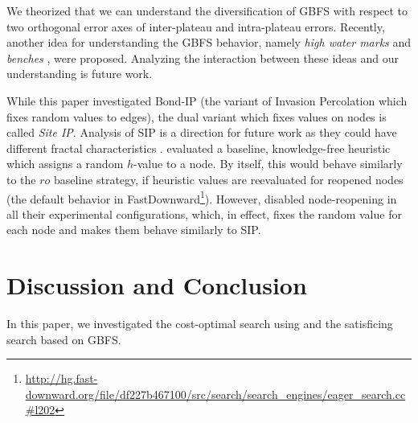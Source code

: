 We theorized that we can understand the diversification of GBFS with
respect to two orthogonal error axes of inter-plateau and intra-plateau
errors. Recently, another idea for understanding the GBFS behavior,
namely \emph{high water marks} \cite{wilt2014speedy} and \emph{benches} \cite{heusner2017understanding}, were proposed.
Analyzing the interaction between these ideas and our understanding is future work.

While this paper investigated Bond-IP (the variant of Invasion Percolation which fixes random values to edges),
the dual variant which fixes values on nodes is called \emph{Site IP}.
Analysis of SIP is a direction for future work as they could have different fractal characteristics \cite{sheppard1999invasion}.
\citeauthor{valenzano2014comparison} \citeyear[Section 4.3]{valenzano2014comparison} evaluated a baseline, knowledge-free heuristic which assigns a random $h$-value to a node.
By itself, this would behave similarly to the $ro$ baseline strategy, if heuristic values are reevaluated for reopened nodes (the default behavior in FastDownward\footnote{\url{http://hg.fast-downward.org/file/df227b467100/src/search/search_engines/eager_search.cc\#l202}}).
However, \citeauthor{valenzano2014comparison} disabled node-reopening in all their experimental configurations, which, in effect, fixes the random value for each node and makes them behave similarly to SIP.


\chapter{Discussion and Conclusion}

In this paper, we investigated the cost-optimal search using \astar and the satisficing search based on GBFS.


\begin{comment} %
We sought to
(1) shed some light on the importance of tie-breaking in \astar,  %
(2) improve \astar without modifying its main heuristic function at all, and (3) to
improve \astar by introducing inadmissible techniques. We reached all of these goals successfully: We sought
various possible enhancements and achieved significant performance improvements solely by the tie-breaking
techniques. In detail, the contributions in this paper are the following:
\end{comment}

